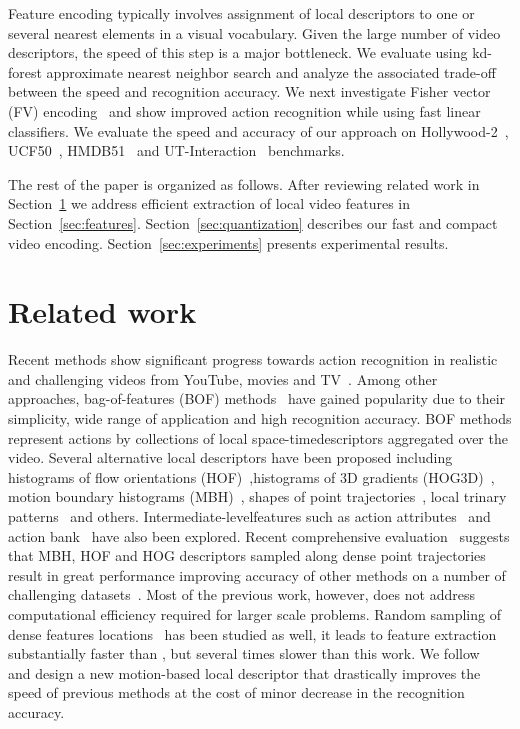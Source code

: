 \documentclass[10pt,twocolumn,letterpaper]{article}
\begin{document}
Feature encoding typically involves assignment of local
descriptors to one or several nearest elements in a visual
vocabulary. Given the large number of video descriptors, the
speed of this step is a major bottleneck. We evaluate using
kd-forest approximate nearest neighbor search \cite{Philbin07}
and analyze the associated trade-off between the speed and
recognition accuracy. We next investigate Fisher vector (FV)
encoding~\cite{Perronnin12} and show improved action recognition while using fast linear classifiers.
We evaluate the speed and accuracy of our approach on
\mbox{Hollywood-2}~\cite{Marszalek09}, UCF50~\cite{Reddy12},
HMDB51~\cite{Kuehne11} and UT-Interaction~\cite{Ryoo10}
benchmarks.

The rest of the paper is organized as follows. 
After reviewing related work in Section~\ref{sec:relatedwork} we address efficient extraction of local video features in
Section~\ref{sec:features}. Section~\ref{sec:quantization}
describes our fast and compact video encoding.
Section~\ref{sec:experiments} presents experimental results.



\section{Related work}
\label{sec:relatedwork}
Recent methods show significant progress towards action
recognition in realistic and challenging videos from YouTube,
movies and
TV~\cite{Laptev08,Laptev07,Liu11,Niebles10,Rodriguez08,Sadanand12,Wang12}.
Among other approaches, bag-of-features (BOF)
methods~\cite{Dollar05,Laptev05,Schuldt04} have gained
popularity due to their simplicity, wide range of application
and high recognition accuracy.
BOF methods represent actions by collections of local space-timedescriptors aggregated over the video.
Several alternative local descriptors have been proposed
including histograms of flow orientations (HOF)~\cite{Laptev08},histograms of 3D gradients
(HOG3D)~\cite{klaser2008spatio,Scovanner07}, motion boundary
histograms (MBH)~\cite{Dalal06,Wang12}, shapes of point
trajectories~\cite{Matikainen09,Messing09,Wang12}, local trinary patterns~\cite{Kliper12,Yeffet09} and others. Intermediate-levelfeatures such as action attributes~\cite{Liu11} and action
bank~\cite{Sadanand12} have also been explored. Recent
comprehensive evaluation~\cite{Wang12} suggests that MBH, HOF
and HOG descriptors sampled along dense point trajectories
result in great performance improving accuracy of other
methods on a number of challenging datasets~\cite{Wang12}. Most
of the previous work, however, does not address computational
efficiency required for larger scale problems. Random sampling
of dense features locations~\cite{Feng13} has been studied as
well, it leads to feature extraction substantially faster than
\cite{Wang12}, but several times slower than this work. We
follow~\cite{Wang12} and design a new motion-based local
descriptor that drastically improves the speed of previous
methods at the cost of minor decrease in the recognition
accuracy.
\end{document}
